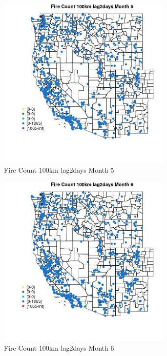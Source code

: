 \begin{figure} 
\centering  
\includegraphics[width=0.77\textwidth]{Code_Outputs/Report_ML_input_PM25_Step4_part_f_de_duplicated_aves_prioritize_24hr_obswNAs_MapObsMo5Fire_Count_100km_lag2days.jpg} 
\caption{\label{fig:Report_ML_input_PM25_Step4_part_f_de_duplicated_aves_prioritize_24hr_obswNAsMapObsMo5Fire_Count_100km_lag2days}Fire Count 100km lag2days Month 5} 
\end{figure} 
 

\begin{figure} 
\centering  
\includegraphics[width=0.77\textwidth]{Code_Outputs/Report_ML_input_PM25_Step4_part_f_de_duplicated_aves_prioritize_24hr_obswNAs_MapObsMo6Fire_Count_100km_lag2days.jpg} 
\caption{\label{fig:Report_ML_input_PM25_Step4_part_f_de_duplicated_aves_prioritize_24hr_obswNAsMapObsMo6Fire_Count_100km_lag2days}Fire Count 100km lag2days Month 6} 
\end{figure} 
 


